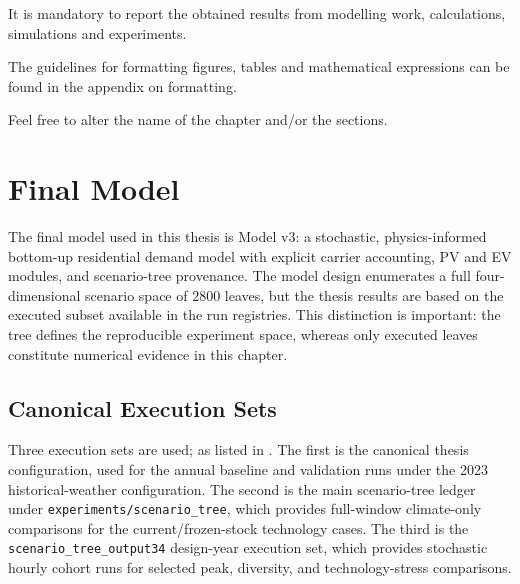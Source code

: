 \label{ch:results}

\begin{explanation}
    It is mandatory to report the obtained results from modelling work, calculations, simulations and experiments.
    
    The guidelines for formatting figures, tables and mathematical expressions can be found in the appendix on formatting.
    
    Feel free to alter the name of the chapter and/or the sections.
\end{explanation}



\section{Final Model}
\label{sec:finalModel}

The final model used in this thesis is Model v3: a stochastic, physics-informed bottom-up residential demand model with explicit carrier accounting, PV and EV modules, and scenario-tree provenance. The model design enumerates a full four-dimensional scenario space of $2800$ leaves, but the thesis results are based on the executed subset available in the run registries. This distinction is important: the tree defines the reproducible experiment space, whereas only executed leaves constitute numerical evidence in this chapter.


\subsection{Canonical Execution Sets}
\label{sec:resultConfigs}

Three execution sets are used; as listed in . The first is the canonical thesis configuration, used for the annual baseline and validation runs under the 2023 historical-weather configuration. The second is the main scenario-tree ledger under \texttt{experiments/scenario\_tree}, which provides full-window climate-only comparisons for the current/frozen-stock technology cases. The third is the \texttt{scenario\_tree\_output34} design-year execution set, which provides stochastic hourly cohort runs for selected peak, diversity, and technology-stress comparisons.

